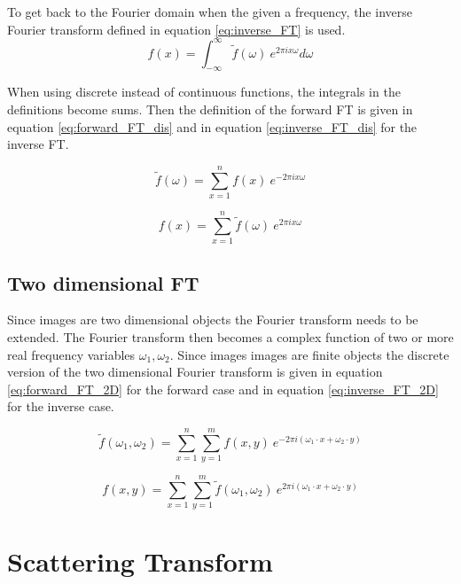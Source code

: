 To get back to the Fourier domain when the given a frequency, the inverse Fourier transform defined in equation \ref{eq:inverse_FT} is used.  \\

\begin{equation}
	f(x) = \int_{-\infty}^{\infty} \tilde{f}(\omega)\ e^{2 \pi i x \omega}d\omega
	\label{eq:inverse_FT}
\end{equation}

When using discrete instead of continuous functions, the integrals in the definitions become sums. Then the definition of the forward FT is given in equation \ref{eq:forward_FT_dis} and in equation \ref{eq:inverse_FT_dis} for the inverse FT. 

\begin{equation}
\tilde{f}(\omega) = \sum_{x=1}^{n} f(x)\ e^{-2\pi i x \omega}
\label{eq:forward_FT_dis}
\end{equation} 

\begin{equation}
f(x) = \sum_{x=1}^{n} \tilde{f}(\omega)\ e^{2 \pi i x \omega}
\label{eq:inverse_FT_dis}
\end{equation}

\subsection{Two dimensional FT}

Since images are two dimensional objects the Fourier transform needs to be extended. The Fourier transform then becomes a complex function of two or more real frequency variables $\omega_1, \omega_2$. Since images images are finite objects the discrete version of the two dimensional Fourier transform is given in equation \ref{eq:forward_FT_2D} for the forward case and in equation \ref{eq:inverse_FT_2D} for the inverse case.

\begin{equation}
	\tilde{f}(\omega_1, \omega_2) = \sum_{x=1}^{n} \sum_{y=1}^{m} f(x,y)\ e^{-2\pi i (\omega_1 \cdot x + \omega_2 \cdot y)}
\label{eq:forward_FT_2D}
\end{equation}

\begin{equation}
f(x, y) = \sum_{x=1}^{n} \sum_{y=1}^{m} \tilde{f}(\omega_1, \omega_2)\ e^{2\pi i (\omega_1 \cdot x + \omega_2 \cdot y)}
\label{eq:inverse_FT_2D}
\end{equation}

\section{Scattering Transform}

